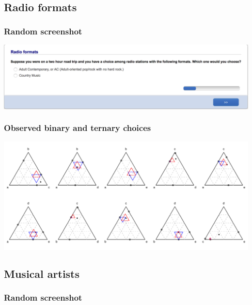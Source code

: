 \documentclass[11pt,letter]{article}
\begin{document}
\pagebreak

\subsection*{Radio formats}



\subsubsection*{Random screenshot}

\includegraphics[width=15cm]{Population_study_design/screenshot_radio.png}

\subsubsection*{Observed binary and ternary choices}

\includegraphics[width=15cm]{./Population_study_data/Simplexes/radio.pdf}

\pagebreak

\subsection*{Musical artists}



\subsubsection*{Random screenshot}
\end{document}

